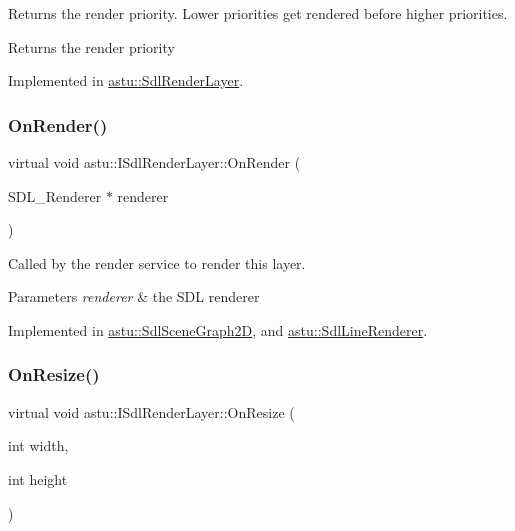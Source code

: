 Returns the render priority. Lower priorities get rendered before higher priorities.

\begin{DoxyReturn}{Returns}
the render priority 
\end{DoxyReturn}


Implemented in \hyperlink{classastu_1_1SdlRenderLayer_ad7217b4bf8b8f0c9e801f72a44fe2f49}{astu\+::\+Sdl\+Render\+Layer}.

\mbox{\label{classastu_1_1ISdlRenderLayer_a18af53e17e7f6f945817ad3e8b8ecc87}} 
\subsubsection{\texorpdfstring{On\+Render()}{OnRender()}}
{\footnotesize\ttfamily virtual void astu\+::\+I\+Sdl\+Render\+Layer\+::\+On\+Render (\begin{DoxyParamCaption}\item[{S\+D\+L\+\_\+\+Renderer $\ast$}]{renderer }\end{DoxyParamCaption})\hspace{0.3cm}{\ttfamily [pure virtual]}}

Called by the render service to render this layer.


\begin{DoxyParams}{Parameters}
{\em renderer} & the S\+DL renderer \\
\hline
\end{DoxyParams}


Implemented in \hyperlink{classastu_1_1SdlSceneGraph2D_a2af5a74277e6478da29ba88d0f11daea}{astu\+::\+Sdl\+Scene\+Graph2D}, and \hyperlink{classastu_1_1SdlLineRenderer_a8860a2549acc8c633df71c7ceeb68c0d}{astu\+::\+Sdl\+Line\+Renderer}.

\mbox{\label{classastu_1_1ISdlRenderLayer_abcded808a2405e1e59413b5d1f981f13}} 
\subsubsection{\texorpdfstring{On\+Resize()}{OnResize()}}
{\footnotesize\ttfamily virtual void astu\+::\+I\+Sdl\+Render\+Layer\+::\+On\+Resize (\begin{DoxyParamCaption}\item[{int}]{width,  }\item[{int}]{height }\end{DoxyParamCaption})\hspace{0.3cm}{\ttfamily [pure virtual]}}

